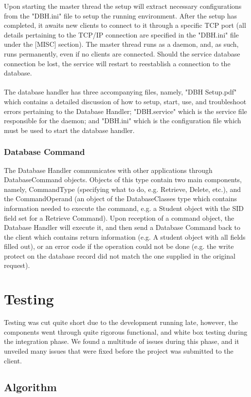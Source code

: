 \documentclass[letterpaper]{report}
\begin{document}
	Upon starting the master thread the setup will extract necessary configurations from the "DBH.ini" file to setup the running environment. After the setup has completed, it awaits new clients to connect to it through a specific TCP port (all details pertaining to the TCP/IP connection are specified in the "DBH.ini" file under the [MISC] section). The master thread runs as a daemon, and, as such, runs permanently, even if no clients are connected. Should the service database connection be lost, the service will restart to reestablish a connection to the database. \\ \\ The database handler has three accompanying files, namely, "DBH Setup.pdf" which contains a detailed discussion of how to setup, start, use, and troubleshoot errors pertaining to the Database Handler; "DBH.service" which is the service file responsible for the daemon; and "DBH.ini" which is the configuration file which must be used to start the database handler.
	\subsection{Database Command}
	The Database Handler communicates with other applications through DatabaseCommand objects. Objects of this type contain two main components, namely, CommandType (specifying what to do, e.g. Retrieve, Delete, etc.), and the CommandOperand (an object of the DatabaseClasses type which contains information needed to execute the command, e.g. a Student object with the SID field set for a Retrieve Command). Upon reception of a command object, the Database Handler will execute it, and then send a Database Command back to the client which contains return information (e.g. A student object with all fields filled out), or an error code if the operation could not be done (e.g. the write protect on the database record did not match the one supplied in the original request).
	\chapter{Testing}
	Testing was cut quite short due to the development running late, however, the components went through quite rigorous functional, and white box testing during the integration phase. We found a multitude of issues during this phase, and it unveiled many issues that were fixed before the project was submitted to the client.
	\section{Algorithm}
	
\end{document}
